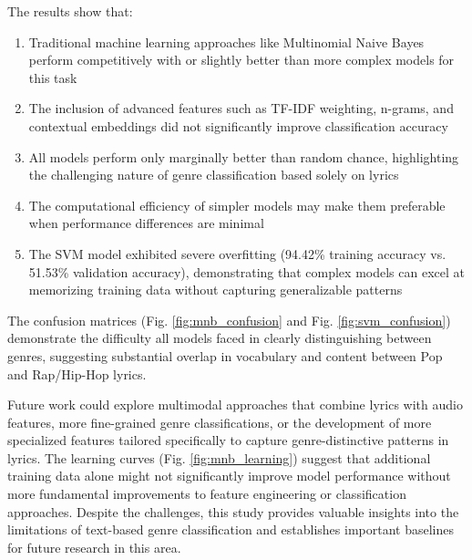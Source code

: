\documentclass[conference]{IEEEtran}
\begin{document}
The results show that:
\begin{enumerate}
\item Traditional machine learning approaches like Multinomial Naive Bayes perform competitively with or slightly better than more complex models for this task
\item The inclusion of advanced features such as TF-IDF weighting, n-grams, and contextual embeddings did not significantly improve classification accuracy
\item All models perform only marginally better than random chance, highlighting the challenging nature of genre classification based solely on lyrics
\item The computational efficiency of simpler models may make them preferable when performance differences are minimal
\item The SVM model exhibited severe overfitting (94.42\% training accuracy vs. 51.53\% validation accuracy), demonstrating that complex models can excel at memorizing training data without capturing generalizable patterns
\end{enumerate}

The confusion matrices (Fig. \ref{fig:mnb_confusion} and Fig. \ref{fig:svm_confusion}) demonstrate the difficulty all models faced in clearly distinguishing between genres, suggesting substantial overlap in vocabulary and content between Pop and Rap/Hip-Hop lyrics.

Future work could explore multimodal approaches that combine lyrics with audio features, more fine-grained genre classifications, or the development of more specialized features tailored specifically to capture genre-distinctive patterns in lyrics. The learning curves (Fig. \ref{fig:mnb_learning}) suggest that additional training data alone might not significantly improve model performance without more fundamental improvements to feature engineering or classification approaches. Despite the challenges, this study provides valuable insights into the limitations of text-based genre classification and establishes important baselines for future research in this area.
\end{document}
